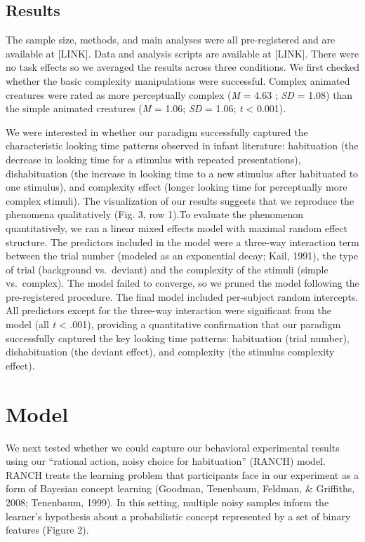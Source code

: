 \documentclass[10pt, letterpaper]{article}
\begin{document}
\hypertarget{results}{%
\subsection{Results}\label{results}}

The sample size, methods, and main analyses were all pre-registered and
are available at {[}LINK{]}. Data and analysis scripts are available at
{[}LINK{]}. There were no task effects so we averaged the results across
three conditions. We first checked whether the basic complexity
manipulations were successful. Complex animated creatures were rated as
more perceptually complex (\emph{M} = 4.63 ; \emph{SD} = 1.08) than the
simple animated creatures (\emph{M} = 1.06; \emph{SD} = 1.06; \emph{t}
\textless{} 0.001).

We were interested in whether our paradigm successfully captured the
characteristic looking time patterns observed in infant literature:
habituation (the decrease in looking time for a stimulus with repeated
presentations), dishabituation (the increase in looking time to a new
stimulus after habituated to one stimulus), and complexity effect
(longer looking time for perceptually more complex stimuli). The
visualization of our results suggests that we reproduce the phenomena
qualitatively (Fig. 3, row 1).To evaluate the phenomenon quantitatively,
we ran a linear mixed effects model with maximal random effect
structure. The predictors included in the model were a three-way
interaction term between the trial number (modeled as an exponential
decay; Kail, 1991), the type of trial (background vs.~deviant) and the
complexity of the stimuli (simple vs.~complex). The model failed to
converge, so we pruned the model following the pre-registered procedure.
The final model included per-subject random intercepts. All predictors
except for the three-way interaction were significant from the model
(all \emph{t} \textless{} .001), providing a quantitative confirmation
that our paradigm successfully captured the key looking time patterns:
habituation (trial number), dishabituation (the deviant effect), and
complexity (the stimulus complexity effect).

\hypertarget{model}{%
\section{Model}\label{model}}

We next tested whether we could capture our behavioral experimental
results using our ``rational action, noisy choice for habituation''
(RANCH) model. RANCH treats the learning problem that participants face
in our experiment as a form of Bayesian concept learning (Goodman,
Tenenbaum, Feldman, \& Griffiths, 2008; Tenenbaum, 1999). In this
setting, multiple noisy samples inform the learner's hypothesis about a
probabilistic concept represented by a set of binary features (Figure
2).
\end{document}
